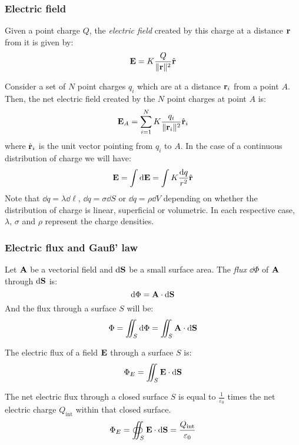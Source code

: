 \documentclass[../../../main.tex]{subfiles}
\begin{document}
\begin{multicols}{2}
    \subsubsection*{Electric field}
    \begin{definition}
        Given a point charge $Q$, the \textit{electric field} created by this charge at a distance $\boldsymbol{\mathrm{r}}$ from it is given by:
        $$\boldsymbol{\mathrm{E}}=K\frac{Q}{\|\boldsymbol{\mathrm{r}}\|^2}\hat{\boldsymbol{\mathrm{r}}}$$
    \end{definition}
    \begin{principle}
        Consider a set of $N$ point charges $q_i$ which are at a distance $\boldsymbol{\mathrm{r}}_i$ from a point $A$. Then, the net electric field created by the $N$ point charges at point $A$ is:
        $$\boldsymbol{\mathrm{E}}_A=\sum_{i=1}^NK\frac{q_i}{\|\boldsymbol{\mathrm{r}}_{i}\|^2}\hat{\boldsymbol{\mathrm{r}}}_{i}$$ where $\hat{\boldsymbol{\mathrm{r}}}_{i}$ is the unit vector pointing from $q_i$ to $A$. In the case of a continuous distribution of charge we will have:
        $$\boldsymbol{\mathrm{E}}=\int\dd\boldsymbol{\mathrm{E}}=\int K\frac{\dd q}{r^2}\hat{\boldsymbol{\mathrm{r}}}$$
        Note that $\dd q=\lambda\dd \ell$, $\dd q=\sigma\dd S$ or $\dd q=\rho\dd V$ depending on whether the distribution of charge is linear, superficial or volumetric. In each respective case, $\lambda$, $\sigma$ and $\rho$ represent the charge densities.
    \end{principle}
    \subsubsection*{Electric flux and Gau\ss' law}
    \begin{definition}
        Let $\boldsymbol{\mathrm{A}}$ be a vectorial field and $\dd\boldsymbol{\mathrm{S}}$ be a small surface area. The \textit{flux $\dd \Phi$} of $\boldsymbol{\mathrm{A}}$ through $\dd \boldsymbol{\mathrm{S}}$ is:
        $$\dd \Phi=\boldsymbol{\mathrm{A}}\cdot\dd\boldsymbol{\mathrm{S}}$$ And the flux through a surface $S$ will be:
        $$\Phi=\iint_S \dd\Phi=\iint_S\boldsymbol{\mathrm{A}}\cdot \dd\boldsymbol{\mathrm{S}}$$
    \end{definition}
    \begin{corollary}
        The electric flux of a field $\boldsymbol{\mathrm{E}}$ through a surface $S$ is:
        $$\Phi_E=\iint_S\boldsymbol{\mathrm{E}}\cdot \dd\boldsymbol{\mathrm{S}}$$
    \end{corollary}
    \begin{law}
        The net electric flux through a closed surface $S$ is equal to $\frac{1}{\varepsilon_0}$ times the net electric charge $Q_\text{int}$ within that closed surface.
        $$\Phi_E=\oiint_S\boldsymbol{\mathrm{E}}\cdot\dd\boldsymbol{\mathrm{S}}=\frac{Q_\text{int}}{\varepsilon_0}$$
    \end{law}

\end{multicols}
\end{document}
